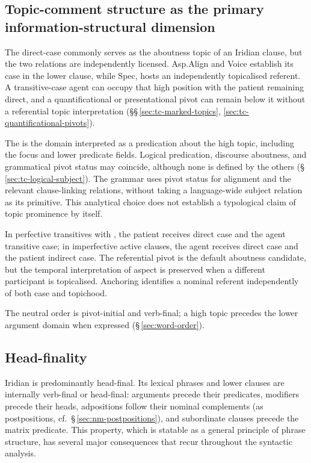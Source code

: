 \subsection{Topic-comment structure as the primary information-structural
dimension}
\label{sec:th-topic-comment-theory}

The direct-case  commonly serves as the aboutness topic
 of an Iridian clause, but the two relations are independently licensed.
 Asp.Align and Voice establish its case in the lower clause, while
 Spec, hosts an independently topicalised referent. A
 transitive-case agent can occupy that high position with the patient remaining
 direct, and a quantificational or presentational pivot can remain below it
 without a referential topic interpretation
 (§§\,\ref{sec:tc-marked-topics}, \ref{sec:tc-quantificational-pivots}).

The  is the domain interpreted as a predication about the high
 topic, including the focus and lower predicate fields. Logical predication,
 discourse aboutness, and grammatical pivot status may coincide, although none
 is defined by the others (§\,\ref{sec:tc-logical-subject}). The grammar uses
 pivot status for alignment and the relevant clause-linking relations, without
 taking a language-wide subject relation as its primitive. This analytical
 choice does not establish a typological claim of topic prominence by itself.

In perfective transitives with , the patient receives direct case and
 the agent transitive case; in imperfective active clauses, the agent receives
 direct case and the patient indirect case. The referential pivot is the
 default aboutness candidate, but the temporal interpretation of aspect is
 preserved when a different participant is topicalised. Anchoring identifies
 a nominal referent independently of both case and topichood.

The neutral order is pivot-initial and verb-final; a high topic precedes the
 lower argument domain when expressed (§\,\ref{sec:word-order}).

\subsection{Head-finality}
\label{sec:th-head-finality}

Iridian is predominantly head-final. Its lexical phrases and lower clauses are
internally verb-final or head-final: arguments precede their predicates,
modifiers precede their heads, adpositions follow their nominal complements (as
postpositions, cf.\ §\,\ref{sec:nm-postpositions}), and subordinate clauses precede
the matrix predicate. This property, which is statable as a general principle of
phrase structure, has several major
consequences that recur throughout the syntactic analysis.

